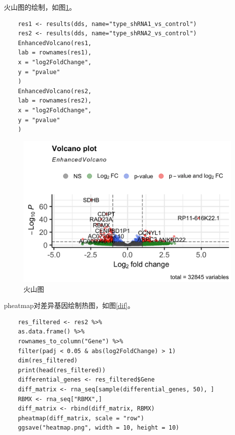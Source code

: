 火山图的绘制，如图\ref{volcano}。
\begin{lstlisting}
    res1 <- results(dds, name="type_shRNA1_vs_control")
    res2 <- results(dds, name="type_shRNA2_vs_control")
    EnhancedVolcano(res1,
    lab = rownames(res1),
    x = "log2FoldChange",
    y = "pvalue"
    )
    EnhancedVolcano(res2,
    lab = rownames(res2),
    x = "log2FoldChange",
    y = "pvalue"
    )
\end{lstlisting}

\begin{figure}[ht]
    \centering
    \includegraphics[width=13cm]{image/rnaseq/volcano.png}
    \caption{火山图}
    \label{volcano}
\end{figure}

pheatmap对差异基因绘制热图，如图\ref{dif}。
\begin{lstlisting}
    res_filtered <- res2 %>%
    as.data.frame() %>%
    rownames_to_column("Gene") %>%
    filter(padj < 0.05 & abs(log2FoldChange) > 1)
    dim(res_filtered)
    print(head(res_filtered))
    differential_genes <- res_filtered$Gene
    diff_matrix <- rna_seq[sample(differential_genes, 50), ]
    RBMX <- rna_seq["RBMX",]
    diff_matrix <- rbind(diff_matrix, RBMX)
    pheatmap(diff_matrix, scale = "row")
    ggsave("heatmap.png", width = 10, height = 10)
\end{lstlisting}

